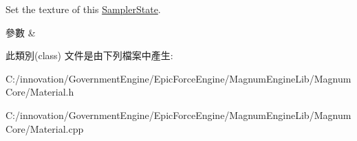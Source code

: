 Set the texture of this \hyperlink{class_i_dream_sky_1_1_material_1_1_sampler_state}{Sampler\+State}. 


\begin{DoxyParams}{參數}
{\em } & \\
\hline
\end{DoxyParams}


此類別(class) 文件是由下列檔案中產生\+:\begin{DoxyCompactItemize}
\item 
C\+:/innovation/\+Government\+Engine/\+Epic\+Force\+Engine/\+Magnum\+Engine\+Lib/\+Magnum\+Core/Material.\+h\item 
C\+:/innovation/\+Government\+Engine/\+Epic\+Force\+Engine/\+Magnum\+Engine\+Lib/\+Magnum\+Core/Material.\+cpp\end{DoxyCompactItemize}
